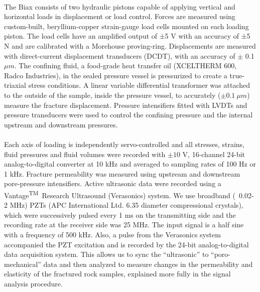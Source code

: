 \documentclass[letterpaper,10pt]{article}
\begin{document}
\paragraph{} The Biax consists of two hydraulic pistons capable of applying vertical and horizontal loads in displacement or load control. Forces are measured using custom-built, beryllium-copper strain-gauge load cells mounted on each loading piston. The load cells have an amplified output of ±5 V with an accuracy of ±5 N and are calibrated with a Morehouse proving-ring. Displacements are measured with direct-current displacement transducers (DCDT), with an accuracy of $\pm$ 0.1 $\mu m$. The confining fluid, a food-grade heat transfer oil (XCELTHERM 600, Radco Industries), in the sealed pressure vessel is pressurized to create a true-triaxial stress conditions. A linear variable differential transformer was attached to the outside of the sample, inside the pressure vessel, to accurately ($\pm 0.1\ \mu m$) measure the fracture displacement. Pressure intensifiers fitted with LVDTs and pressure transducers were used to control the confining pressure and the internal upstream and downstream pressures. 

\paragraph{} Each axis of loading is independently servo-controlled and all stresses, strains, fluid pressures and fluid volumes were recorded with $\pm10$ V, 16-channel 24-bit analog-to-digital converter at 10 kHz and averaged to sampling rates of 100 Hz or 1 kHz. Fracture permeability was measured using upstream and downstream pore-pressure intensifiers. Active ultrasonic data were recorded using a Vantage\textsuperscript{TM}\ Research Ultrasound (Verasonics) system. We use broadband (~0.02-2 MHz) PZTs (APC International Ltd. 6.35 diameter compressional crystals), which were successively pulsed every 1 ms on the transmitting side and the recording rate at the receiver side was 25 MHz. The input signal is a half sine with a frequency of 500 kHz. Also, a pulse from the Verasonics system accompanied the PZT excitation and is recorded by the 24-bit analog-to-digital data acquisition system. This allows us to sync the “ultrasonic” to “poro-mechanical” data and then analyzed to measure changes in the permeability and elasticity of the fractured rock samples, explained more fully in the signal analysis procedure.
  
\end{document}
